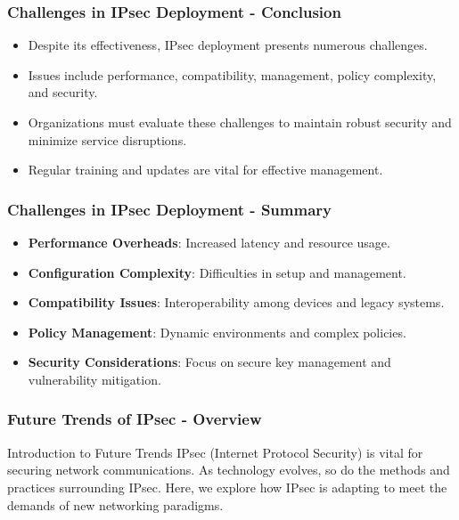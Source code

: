 \documentclass{beamer}
\begin{document}
\begin{frame}[fragile]
    \frametitle{Challenges in IPsec Deployment - Conclusion}
    \begin{itemize}
        \item Despite its effectiveness, IPsec deployment presents numerous challenges.
        \item Issues include performance, compatibility, management, policy complexity, and security.
        \item Organizations must evaluate these challenges to maintain robust security and minimize service disruptions.
        \item Regular training and updates are vital for effective management.
    \end{itemize}
\end{frame}

\begin{frame}[fragile]
    \frametitle{Challenges in IPsec Deployment - Summary}
    \begin{itemize}
        \item \textbf{Performance Overheads}: Increased latency and resource usage.
        \item \textbf{Configuration Complexity}: Difficulties in setup and management.
        \item \textbf{Compatibility Issues}: Interoperability among devices and legacy systems.
        \item \textbf{Policy Management}: Dynamic environments and complex policies.
        \item \textbf{Security Considerations}: Focus on secure key management and vulnerability mitigation.
    \end{itemize}
\end{frame}

\begin{frame}[fragile]
    \frametitle{Future Trends of IPsec - Overview}
    \begin{block}{Introduction to Future Trends}
        IPsec (Internet Protocol Security) is vital for securing network communications. As technology evolves, so do the methods and practices surrounding IPsec. Here, we explore how IPsec is adapting to meet the demands of new networking paradigms.
    \end{block}
\end{frame}
\end{document}
